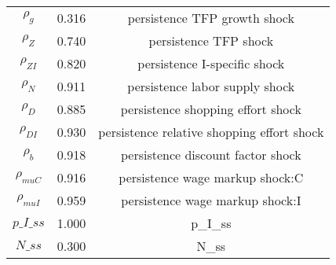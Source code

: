 \begin{center}
\begin{longtable}{ccc}
${\rho_g}$ 	 & 	 0.316 	 & 	 persistence TFP growth shock\\
${\rho_Z}$ 	 & 	 0.740 	 & 	 persistence TFP shock\\
${\rho_{ZI}}$ 	 & 	 0.820 	 & 	 persistence I-specific shock\\
${\rho_N}$ 	 & 	 0.911 	 & 	 persistence labor supply shock\\
${\rho_D}$ 	 & 	 0.885 	 & 	 persistence shopping effort shock\\
${\rho_{DI}}$ 	 & 	 0.930 	 & 	 persistence relative shopping effort shock\\
${\rho_b}$ 	 & 	 0.918 	 & 	 persistence discount factor shock\\
${\rho_{muC}}$ 	 & 	 0.916 	 & 	 persistence wage markup shock:C\\
${\rho_{muI}}$ 	 & 	 0.959 	 & 	 persistence wage markup shock:I\\
$p\_I\_ss$ 	 & 	 1.000 	 & 	 p\_I\_ss\\
$N\_ss$ 	 & 	 0.300 	 & 	 N\_ss\\
\bottomrule%
\end{longtable}
\end{center}
